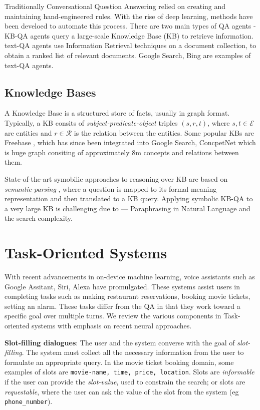 \documentclass[11pt,a4paper]{article}
\begin{document}
Traditionally Conversational Question Answering relied on creating and maintaining hand-engineered rules. With the rise of deep learning, methods have been develoed to automate this process. There are two main types of QA agents - KB-QA agents query a large-scale Knowledge Base (KB) to retrieve information. text-QA agents use Information Retrieval techniques on a document collection, to obtain a ranked list of relevant documents. Google Search, Bing are examples of text-QA agents.

\subsection{Knowledge Bases}

A Knowledge Base is a structured store of facts, usually in graph format. Typically, a KB consits of \textit{subject-predicate-object} triples $(s,r,t)$, where $s, t \in \mathcal{E}$ are entities and $r \in \mathcal{R}$ is the relation between the entities. Some popular KBs are Freebase \cite{Bollacker2008FreebaseAC}, which has since been integrated into Google Search, ConcpetNet \cite{Speer2016ConceptNet5A} which is huge graph consiting of approximately 8m concepts and relations between them.

\noindent State-of-the-art symobilic approaches to reasoning over KB are based on \textit{semantic-parsing} \cite{Berant2013SemanticPO, Einolghozati2019ImprovingSP}, where a question is mapped to its formal meaning representation and then translated to a KB query. Applying symbolic KB-QA to a very large KB is challenging due to --- Paraphrasing in Natural Language and the search complexity.

\section{Task-Oriented Systems}

With recent advancements in on-device machine learning, voice assistants such as Google Assitant, Siri, Alexa have promulgated. These systems assist users in completing tasks such as making restaurant reservations, booking movie tickets, setting an alarm. These tasks differ from the QA in that they work toward a specific goal over multiple turns. We review the various components in Task-oriented systems with emphasis on recent neural approaches.

\medskip \noindent \textbf{Slot-filling dialogues}: The user and the system converse with the goal of \textit{slot-filling}. The system must collect all the necessary information from the user to formulate an appropriate query. In the movie ticket booking domain, some examples of slots are \texttt{movie-name, time, price, location}. Slots are \textit{informable} if the user can provide the \textit{slot-value}, used to constrain the search; or slots are \textit{requestable}, where the user can ask the value of the slot from the system (eg \texttt{phone\_number}).
\end{document}
